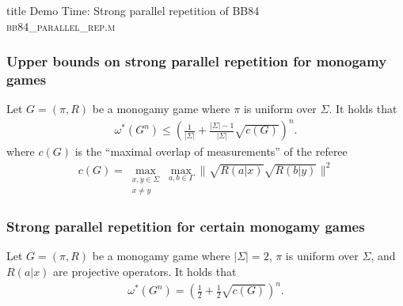 \documentclass{beamer}
\newcommand{\tinyspace}{\mspace{1mu}}
\newcommand{\abs}[1]{\lvert #1 \rvert}
\newcommand{\biggnorm}[1]{\biggl\lVert\tinyspace #1 \tinyspace\biggr\rVert}
\begin{document}
\begin{frame}[noframenumbering]
  \vfill
  \centering
  \begin{beamercolorbox}[sep=8pt,center,shadow=true,rounded=true]{title}
     Demo Time: Strong parallel repetition of BB84 \\ \textsc{bb84\_parallel\_rep.m}
  \end{beamercolorbox}
  \vfill
  \end{frame}

\begin{frame}
	\frametitle{Upper bounds on strong parallel repetition for monogamy games}
	\begin{theorem}
		Let $G = (\pi,R)$ be a monogamy game where $\pi$ is uniform over $\Sigma$. It holds that 
		\begin{align*}
			\omega^*(G^n) \leq \left( \frac{1}{\abs{\Sigma}} + \frac{\abs{\Sigma} - 1}{\abs{\Sigma}} \sqrt{c(G)} \right)^n. 
		\end{align*}
where $c(G)$ is the ``maximal overlap of measurements'' of the referee
	\begin{align*}
		c(G) = \max_{ \substack{ x,y \in \Sigma \\ x \not= y } } \max_{a,b \in \Gamma} \biggnorm{ \sqrt{R(a|x)} \sqrt{R(b|y)} }^2
	\end{align*}
	\end{theorem}		
\end{frame}   

\begin{frame}
	\frametitle{Strong parallel repetition for certain monogamy games}
		\begin{theorem}
		Let $G = (\pi,R)$ be a monogamy game where $\abs{\Sigma} = 2$, $\pi$ is uniform over $\Sigma$, and $R(a|x)$ are projective operators. It holds that 
		\begin{align*}
			\omega^*(G^n) = \left( \frac{1}{2} + \frac{1}{2} \sqrt{c(G)} \right)^n. 
		\end{align*}
	\end{theorem}

\end{frame}     
\end{document}
